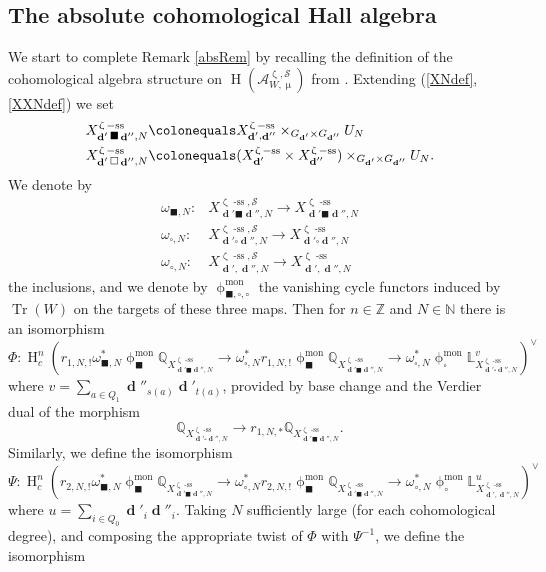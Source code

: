 \documentclass[a4paper,10pt]{amsart}
\renewcommand{\zeta}{\upzeta}
\renewcommand{\phi}{\upphi}
\renewcommand{\mu}{\upmu}
\newcommand{\LL}{\mathbb{L}}
\newcommand{\NN}{\mathbb{N}}
\newcommand{\QQ}{\mathbb{Q}}
\newcommand{\SP}{\mathcal{S}}
\newcommand{\ZZ}{\mathbb{Z}}
\newcommand{\phim}[1]{\phi^{\mon}_{#1}}
\DeclareMathOperator{\sst}{-ss}
\DeclareMathOperator{\mon}{mon}
\DeclareMathOperator{\dd}{\mathbf{d}}
\DeclareMathOperator{\Tr}{Tr}
\DeclareMathOperator{\HO}{H}
\begin{document}
\subsection{The absolute cohomological Hall algebra}
We start to complete Remark \ref{absRem} by recalling the definition of the cohomological algebra structure on $\HO(\mathcal{A}^{\zeta,\SP}_{W,\mu})$ from \cite{KS2}.  Extending (\ref{XNdef}, \ref{XXNdef}) we set
\begin{align*}
X^{\zeta\sst}_{\dd'\blacksquare\dd'',N} \colonequals &X_{\dd',\dd''}^{\zeta\sst}\times_{G_{\dd'}\times G_{\dd''}}U_N\\
X^{\zeta\sst}_{\dd'\square\dd'',N} \colonequals &(X^{\zeta\sst}_{\dd'}\times X^{\zeta\sst}_{\dd''})\times _{G_{\dd'}\times G_{\dd''}}U_N.
\end{align*}
We denote by
\begin{align*}
\omega_{\blacksquare,N}\colon &X^{\zeta\sst,\SP}_{\dd'\blacksquare\dd'',N}\rightarrow X^{\zeta\sst}_{\dd'\blacksquare\dd'',N}\\
\omega_{\square,N}\colon &X^{\zeta\sst,\SP}_{\dd'\square\dd'',N}\rightarrow X^{\zeta\sst}_{\dd'\square\dd'',N}\\
\omega_{\circ,N}\colon &X^{\zeta\sst,\SP}_{\dd',\dd'',N}\rightarrow X^{\zeta\sst}_{\dd',\dd'',N}
\end{align*}
the inclusions, and we denote by $\phim{\blacksquare,\square,\circ}$ the vanishing cycle functors induced by $\Tr(W)$ on the targets of these three maps.  Then for $n\in\ZZ$ and $N\in\NN$ there is an isomorphism
\[
\Phi\colon \HO_c^n\left(r_{1,N,!}\omega_{\blacksquare,N}^*\phim{\blacksquare}\QQ_{X^{\zeta\sst}_{\dd'\blacksquare\dd'',N}}\rightarrow\omega_{\square,N}^*r_{1,N,!}\phim{\blacksquare}\QQ_{X^{\zeta\sst}_{\dd'\blacksquare\dd'',N}}\rightarrow \omega_{\square,N}^*\phim{\square}\LL^{v}_{X^{\zeta\sst}_{\dd'\square\dd'',N}}\right)^{\vee}
\]
where $v=\sum_{a\in Q_1}\dd''_{s(a)}\dd'_{t(a)}$, provided by base change and the Verdier dual of the morphism
\[
\QQ_{X^{\zeta\sst}_{\dd'\square\dd'',N}}\rightarrow r_{1,N,*}\QQ_{X^{\zeta\sst}_{\dd'\blacksquare\dd'',N}}.
\]
Similarly, we define the isomorphism
\[
\Psi\colon \HO_c^n\left(r_{2,N,!}\omega_{\blacksquare,N}^*\phim{\blacksquare}\QQ_{X^{\zeta\sst}_{\dd'\blacksquare\dd'',N}}\rightarrow\omega_{\circ,N}^*r_{2,N,!}\phim{\blacksquare}\QQ_{X^{\zeta\sst}_{\dd'\blacksquare\dd'',N}}\rightarrow \omega_{\circ,N}^*\phim{\circ}\LL^{u}_{X^{\zeta\sst}_{\dd',\dd'',N}}\right)^{\vee}
\]
where $u=\sum_{i\in Q_0}\dd'_i\dd''_i$.  Taking $N$ sufficiently large (for each cohomological degree), and composing the appropriate twist of $\Phi$ with $\Psi^{-1}$, we define the isomorphism
\end{document}

